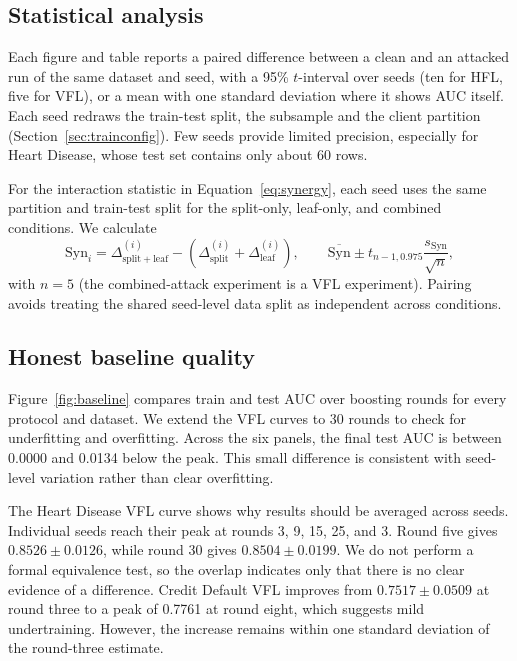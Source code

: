 \documentclass[11pt]{article}
\newcommand{\rev}[1]{#1}
\begin{document}
\subsection{Statistical analysis}
\label{sec:statmethod}

\rev{Each figure and table reports a paired difference between a clean and an attacked run of the same dataset and seed, with a 95\% $t$-interval over seeds (ten for HFL, five for VFL), or a mean with one standard deviation where it shows AUC itself. Each seed redraws the train-test split, the subsample and the client partition (Section~\ref{sec:trainconfig}).} Few seeds provide limited precision, especially for Heart Disease, whose test set contains only about 60 rows.

For the interaction statistic in Equation~\ref{eq:synergy}, each seed uses the same partition and train-test split for the split-only, leaf-only, and combined conditions. We calculate
\begin{equation}
\mathrm{Syn}_i
=\Delta_{\mathrm{split}+\mathrm{leaf}}^{(i)}
-\left(\Delta_{\mathrm{split}}^{(i)}+\Delta_{\mathrm{leaf}}^{(i)}\right),
\qquad
\overline{\mathrm{Syn}}
\mathbin{\pm}
t_{n-1,0.975}\frac{s_{\mathrm{Syn}}}{\sqrt{n}},
\label{eq:synergyci}
\end{equation}
with $n=5$ \rev{(the combined-attack experiment is a VFL experiment)}. Pairing avoids treating the shared seed-level data split as independent across conditions.

\subsection{Honest baseline quality}
\label{sec:baselinequality}

Figure~\ref{fig:baseline} compares train and test AUC over boosting rounds for every protocol and dataset. We extend the VFL curves to 30 rounds to check for underfitting and overfitting. Across the six panels, the final test AUC is between 0.0000 and 0.0134 below the peak. This small difference is consistent with seed-level variation rather than clear overfitting.

The Heart Disease VFL curve shows why results should be averaged across seeds. Individual seeds reach their peak at rounds 3, 9, 15, 25, and 3. Round five gives $0.8526\pm0.0126$, while round 30 gives $0.8504\pm0.0199$. We do not perform a formal equivalence test, so the overlap indicates only that there is no clear evidence of a difference. Credit Default VFL improves from $0.7517\pm0.0509$ at round three to a peak of 0.7761 at round eight, which suggests mild undertraining. However, the increase remains within one standard deviation of the round-three estimate.
\end{document}
